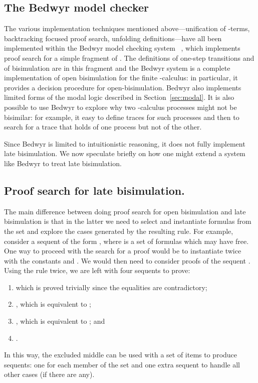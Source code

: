 \documentclass{acmtrans2m}
\begin{document}
\subsection{The Bedwyr model checker}

The various implementation techniques mentioned above---unification of
-terms, backtracking focused proof search, unfolding
definitions---have all been implemented within the Bedwyr model
checking system ~\cite{baelde07cade}, which implements proof search for a
simple fragment \cite{tiu05eshol} of .  The definitions of
one-step transitions and of bisimulation are in this fragment and the
Bedwyr system is a complete implementation of open bisimulation for
the finite -calculus: in particular, it provides a decision
procedure for open-bisimulation.  Bedwyr also implements limited forms
of the modal logic described in Section~\ref{sec:modal}.  It is also
possible to use Bedwyr to explore why two -calculus
processes might not be bisimilar: for example, it easy to define
traces for such processes and then to search for a trace that holds of
one process but not of the other. 


Since Bedwyr is limited to intuitionistic reasoning, it does not
fully implement late bisimulation.  We now speculate briefly on how
one might extend a system like Bedwyr to treat late bisimulation.

\subsection{Proof search for late bisimulation.}
The main difference between doing proof search for open bisimulation
and late bisimulation is that in the latter we need to select and
instantiate formulas from the set  and explore the cases
generated by the resulting  rule. 
For example, consider a sequent of the form , where  is a set of
formulas 
which may have  free.  One way to proceed with the search for a proof
would be to instantiate  twice with the
constants  and .  We would then need to consider proofs of the
sequent  
.
Using the  rule twice, we are left with four sequents to prove:
\begin{enumerate}
\item  which is 
  proved trivially since the equalities are contradictory; 
\item , which is
  equivalent to ;
\item , which is
  equivalent to ; and 
\item .
\end{enumerate}
In this way, the excluded middle can be used with a set of  items
to produce  sequents: one for each member of the set and
one extra sequent to handle all other cases (if there are any).
\end{document}

